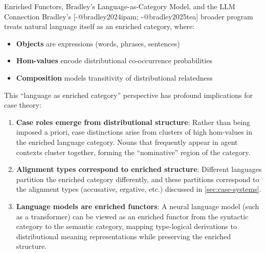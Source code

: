 \documentclass[
  ignorenonframetext,
]{beamer}
\providecommand{\tightlist}{%
  \setlength{\itemsep}{0pt}\setlength{\parskip}{0pt}}
\begin{document}
\begin{frame}{Enriched Functors, Bradley's Language-as-Category Model,
and the LLM Connection}
\protect{}\label{enriched-functors-bradleys-language-as-category-model-and-the-llm-connection}
Bradley's {[}-@bradley2024ipam; -@bradley2025tea{]} broader program
treats natural language itself as an enriched category, where:

\begin{itemize}
\tightlist
\item
  \textbf{Objects} are expressions (words, phrases, sentences)
\item
  \textbf{Hom-values} encode distributional co-occurrence probabilities
\item
  \textbf{Composition} models transitivity of distributional relatedness
\end{itemize}

This ``language as enriched category'' perspective has profound
implications for case theory:

\begin{enumerate}
\item
  \textbf{Case roles emerge from distributional structure}: Rather than
  being imposed a priori, case distinctions arise from clusters of high
  hom-values in the enriched language category. Nouns that frequently
  appear in agent contexts cluster together, forming the ``nominative''
  region of the category.
\item
  \textbf{Alignment types correspond to enriched structure}: Different
  languages partition the enriched category differently, and these
  partitions correspond to the alignment types (accusative, ergative,
  etc.) discussed in \autoref{sec:case-systems}.
\item
  \textbf{Language models are enriched functors}: A neural language
  model (such as a transformer) can be viewed as an enriched functor
  from the syntactic category to the semantic category, mapping
  type-logical derivations to distributional meaning representations
  while preserving the enriched structure.
\end{enumerate}


\end{frame}
\end{document}
